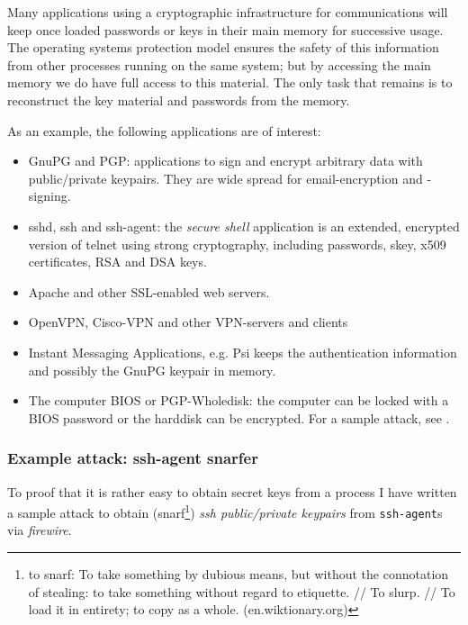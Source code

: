 Many applications using a cryptographic infrastructure for communications will
keep once loaded passwords or keys in their main memory for successive usage.
The operating systems protection model ensures the safety of this information
from other processes running on the same system; but by accessing the main
memory we do have full access to this material. The only task that remains is to
reconstruct the key material and passwords from the memory.

As an example, the following applications are of interest:

\begin{itemize}

	\item GnuPG and PGP: applications to sign and encrypt arbitrary data
	with public/private keypairs. They are wide spread for email-encryption
	and -signing.

	\item sshd, ssh and ssh-agent: the \emph{secure shell} application is an
	extended, encrypted version of telnet using strong cryptography,
	including passwords, skey, x509 certificates, RSA and DSA keys.

	\item Apache and other SSL-enabled web servers.

	\item OpenVPN, Cisco-VPN and other VPN-servers and clients

	\item Instant Messaging Applications, e.g. Psi keeps the authentication
	information and possibly the GnuPG keypair in memory.

	\item The computer BIOS or PGP-Wholedisk: the computer can be locked
	with a BIOS password or the harddisk can be encrypted. For a sample
	attack, see \cite{rux2k6firewire:2006}.


\end{itemize}


\subsubsection{Example attack: ssh-agent snarfer}

\label{ssh-agent-snarfer} To proof that it is rather easy to obtain secret keys
from a process I have written a sample attack to obtain (snarf\footnote{to
snarf: To take something by dubious means, but without the connotation of
stealing: to take something without regard to etiquette. // To slurp. // To load
it in entirety; to copy as a whole. (en.wiktionary.org)}) \emph{ssh
public/private keypairs} from \texttt{ssh-agent}s via \emph{firewire}.


